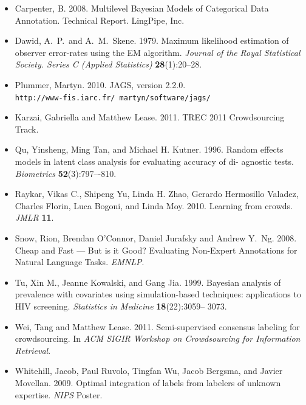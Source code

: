 \documentclass{article}
\begin{document}
\begin{itemize}
%
\item Carpenter, B. 2008. Multilevel Bayesian Models of
Categorical Data Annotation.  Technical Report.  LingPipe, Inc.
%
\item Dawid, A.~P.\ and A.~M.~Skene. 1979.  Maximum likelihood
estimation of observer error-rates using the EM algorithm.  {\it
Journal of the Royal Statistical Society. Series C (Applied
Statistics)} {\bf 28}(1):20--28.
%
\item Plummer, Martyn. 2010.  JAGS, version 2.2.0. 
\\ {\tt http://www-fis.iarc.fr/~martyn/software/jags/}
%
\item Karzai, Gabriella and Matthew Lease. 2011.  TREC 2011
Crowdsourcing Track.
%
\item
Qu, Yinsheng, Ming Tan, and Michael H. Kutner. 1996. Random effects
models in latent class analysis for evaluating accuracy of di-
agnostic tests. {\it Biometrics} {\bf 52}(3):797–-810.
%
\item
Raykar, Vikas C., Shipeng Yu, Linda H. Zhao, Gerardo Hermosillo
Valadez, Charles Florin, Luca Bogoni, 
and Linda Moy.  2010. Learning from crowds. {\it JMLR} {\bf 11}.
%
\item Snow, Rion, Brendan O'Connor, Daniel Jurafsky and Andrew
Y.~Ng. 2008. 
Cheap and Fast --- But is it Good? Evaluating Non-Expert Annotations
for Natural Language Tasks. 
{\it EMNLP}.
%
\item 
Tu, Xin M., Jeanne Kowalski, and Gang Jia. 1999.
Bayesian analysis of prevalence with covariates using simulation-based
techniques: applications to HIV screening. 
{\it Statistics in Medicine} {\bf 18}(22):3059– 3073.
%
\item Wei, Tang and Matthew Lease. 2011.  Semi-supervised consensus
labeling for crowdsourcing. In {\it ACM SIGIR Workshop on Crowdsourcing for
Information Retrieval}.
%
\item Whitehill, Jacob, Paul Ruvolo, Tingfan Wu, Jacob Bergsma, and
Javier Movellan. 2009. Optimal integration of labels from labelers of
unknown expertise. {\it NIPS} Poster. 
%
\end{itemize}
\end{document}
